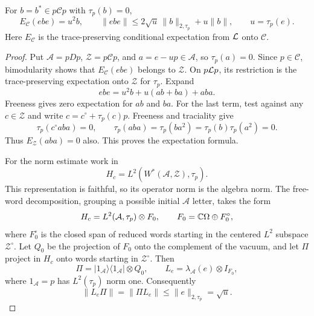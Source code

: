 \begin{lemma}
\label{lem:free-compression}
For $b=b^*\in p\mathcal C p$ with $\tau_p(b)=0$,
\begin{equation}
  E_{\mathcal C}(ebe)=u^2b,\qquad
  \|ebe\|\le2\sqrt u\,\|b\|_{2,\tau_p}+u\|b\|,
  \qquad u=\tau_p(e).
  \label{eq:free-compression}
\end{equation}
Here $E_{\mathcal C}$ is the trace-preserving conditional expectation
from $\mathcal L$ onto $\mathcal C$.
\end{lemma}

\begin{proof}
Put $\mathcal A=pDp$, $\mathcal Z=p\mathcal C p$, and
$a=e-up\in\mathcal A$, so $\tau_p(a)=0$. Since $p\in\mathcal C$,
bimodularity shows that $E_{\mathcal C}(ebe)$ belongs to $\mathcal Z$.
On $p\mathcal L p$, its restriction is the trace-preserving expectation onto
$\mathcal Z$ for $\tau_p$. Expand
\[
  ebe=u^2b+u(ab+ba)+aba.
\]
Freeness gives zero expectation for $ab$ and $ba$. For the last term,
test against any $c\in\mathcal Z$ and write
$c=c^\circ+\tau_p(c)p$. Freeness and traciality give
\[
  \tau_p(c^\circ aba)=0,
  \qquad \tau_p(aba)=\tau_p(ba^2)
                  =\tau_p(b)\tau_p(a^2)=0.
\]
Thus $E_{\mathcal Z}(aba)=0$ also. This proves the expectation formula.

For the norm estimate work in
\[
  H_c=L^2(W^*(\mathcal A,\mathcal Z),\tau_p).
\]
This representation is faithful, so its operator norm is the algebra
norm. The free-word decomposition, grouping a possible initial
$\mathcal A$ letter, takes the form
\[
  H_c=L^2(\mathcal A,\tau_p)\otimes F_0,
  \qquad F_0=\mathbb C\Omega\oplus F_0^\circ,
\]
where $F_0^\circ$ is the closed span of reduced words starting in the
centered $L^2$ subspace $\mathcal Z^\circ$. Let $Q_0$
be the projection of $F_0$ onto the complement of the vacuum, and let
$\Pi$ project in $H_c$ onto words starting in $\mathcal Z^\circ$.
Then
\[
  \Pi=|1_{\mathcal A}\rangle\langle1_{\mathcal A}|\otimes Q_0,
  \qquad L_e=\lambda_{\mathcal A}(e)\otimes I_{F_0},
\]
where $1_{\mathcal A}=p$ has $L^2(\tau_p)$ norm one. Consequently
\begin{equation}
  \|L_e\Pi\|=\|\Pi L_e\|\le\|e\|_{2,\tau_p}=\sqrt u.
  \label{eq:corner-overlap}
\end{equation}


\end{proof}
